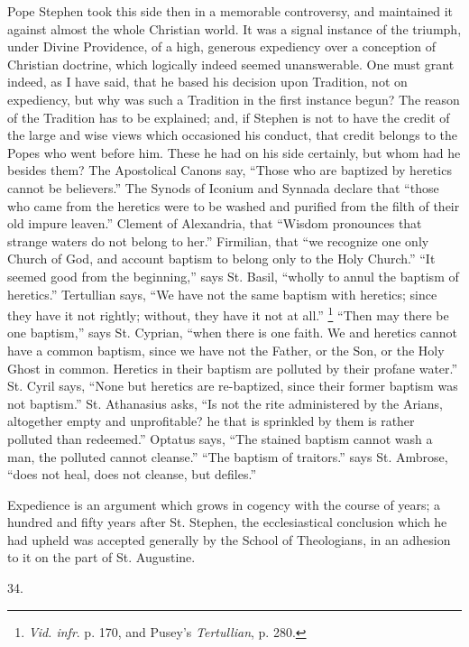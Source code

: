 Pope Stephen took this side then in a memorable controversy, and
maintained it against almost the whole Christian world. It was a
signal instance of the triumph, under Divine Providence, of a high,
generous expediency over a conception of Christian doctrine, which
logically indeed seemed unanswerable. One must grant indeed, as I have
said, that he based his decision upon Tradition, not on expediency,
but why was such a Tradition in the first instance begun? The reason
of the Tradition has to be explained; and, if Stephen is not to have
the credit of the large and wise views which occasioned his
conduct, that credit belongs to the Popes who went before him. These
he had on his side certainly, but whom had he besides them? The
Apostolical Canons say, ``Those who are baptized by heretics
cannot be believers.'' The Synods of Iconium and Synnada declare
that ``those who came from the heretics were to be washed and
purified from the filth of their old impure leaven.'' Clement of
Alexandria, that ``Wisdom pronounces that strange waters do not
belong to her.'' Firmilian, that ``we recognize one only
Church of God, and account baptism to belong only to the Holy
Church.'' ``It seemed good from the beginning,'' says St.
Basil, ``wholly to annul the baptism of heretics.'' Tertullian
says, ``We have not the same baptism with heretics; since they
have it not rightly; without, they have it not at all.'' \footnote{\emph{Vid. infr}. p. 170, and Pusey's \emph{Tertullian},
p. 280.} ``Then may there be one baptism,'' says St. Cyprian,
``when there is one faith. We and heretics cannot have a common
baptism, since we have not the Father, or the Son, or the Holy Ghost
in common. Heretics in their baptism are polluted by their profane
water.'' St. Cyril says, ``None but heretics are re-baptized,
since their former baptism was not baptism.'' St. Athanasius asks,
``Is not the rite administered by the Arians, altogether
empty and unprofitable? he that is sprinkled by them is rather
polluted than redeemed.'' Optatus says, ``The stained baptism
cannot wash a man, the polluted cannot cleanse.'' ``The
baptism of traitors.'' says St. Ambrose, ``does not heal, does
not cleanse, but defiles.''

Expedience is an argument which grows in cogency with the course of
years; a hundred and fifty years after St. Stephen, the ecclesiastical
conclusion which he had upheld was accepted generally by the School of
Theologians, in an adhesion to it on the part of St. Augustine.

34.

